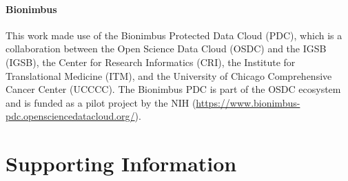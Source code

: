 \documentclass[10pt,letterpaper]{article}
\begin{document}
\paragraph{Bionimbus}
This work made use of the
Bionimbus Protected Data Cloud (PDC), which is a collaboration between
the Open Science Data Cloud (OSDC) and the IGSB (IGSB), the Center for
Research Informatics (CRI), the Institute for Translational Medicine
(ITM), and the University of Chicago Comprehensive Cancer Center
(UCCCC). The Bionimbus PDC is part of the OSDC ecosystem and is funded
as a pilot project by the NIH \cite{heath2014bionimbus} (\url{https://www.bionimbus-pdc.opensciencedatacloud.org/}).


\nolinenumbers


%
%
% 



\section*{Supporting Information}
\end{document}

